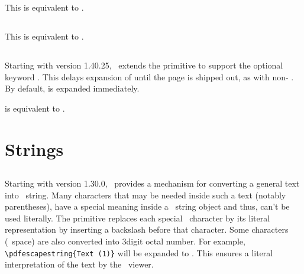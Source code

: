 \documentclass{pdftexmanual}
\begin{document}
This is equivalent to .

\subsection{}

This is equivalent to .

\subsection{}

Starting with version 1.40.25, \PDFTEX\ extends the 
primitive to support the optional keyword . This delays
expansion of  until the page is shipped out, as with
non- . By default,  is expanded
immediately.

 is equivalent to .

\section{Strings}

\subsection{}

Starting with version 1.30.0, \PDFTEX\ provides a mechanism for
converting a general text into \PDF\ string. Many characters that may be
needed inside such a text (notably parentheses), have a special meaning
inside a \PDF\ string object and thus, can't be used literally. The
primitive replaces each special \PDF\ character by its literal
representation by inserting a backslash before that character. Some
characters (\eg\ space) are also converted into 3\hyph digit octal
number. For example, \verb|\pdfescapestring{Text (1)}| will be expanded
to . This ensures a literal interpretation of the
text by the \PDF\ viewer. 
\end{document}
